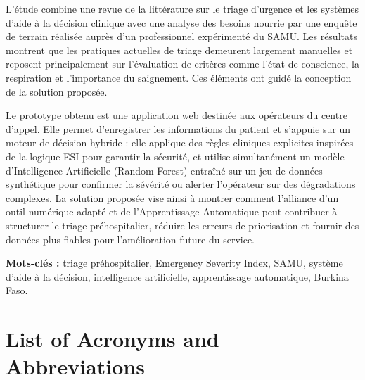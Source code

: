 \documentclass[a4paper,12pt,oneside]{report}
\begin{document}
L'\'etude combine une revue de la litt\'erature sur le triage d'urgence et les syst\`emes d'aide \`a la d\'ecision clinique avec une analyse des besoins nourrie par une enqu\^ete de terrain r\'ealis\'ee aupr\`es d'un professionnel exp\'eriment\'e du SAMU. Les r\'esultats montrent que les pratiques actuelles de triage demeurent largement manuelles et reposent principalement sur l'\'evaluation de crit\`eres comme l'\'etat de conscience, la respiration et l'importance du saignement. Ces \'el\'ements ont guid\'e la conception de la solution propos\'ee.

Le prototype obtenu est une application web destin\'ee aux op\'erateurs du centre d'appel. Elle permet d'enregistrer les informations du patient et s'appuie sur un moteur de d\'ecision hybride : elle applique des r\`egles cliniques explicites inspir\'ees de la logique ESI pour garantir la s\'ecurit\'e, et utilise simultan\'ement un mod\`ele d'Intelligence Artificielle (Random Forest) entra\^in\'e sur un jeu de donn\'ees synth\'etique pour confirmer la s\'ev\'erit\'e ou alerter l'op\'erateur sur des d\'egradations complexes. La solution propos\'ee vise ainsi \`a montrer comment l'alliance d'un outil num\'erique adapt\'e et de l'Apprentissage Automatique peut contribuer \`a structurer le triage pr\'ehospitalier, r\'eduire les erreurs de priorisation et fournir des donn\'ees plus fiables pour l'am\'elioration future du service.

\vspace{0.5cm}
\noindent\textbf{Mots-cl\'es :} triage pr\'ehospitalier, Emergency Severity Index, SAMU, syst\`eme d'aide \`a la d\'ecision, intelligence artificielle, apprentissage automatique, Burkina Faso.

\clearpage

\section*{List of Acronyms and Abbreviations}
\renewcommand{\arraystretch}{1.3}
\end{document}
